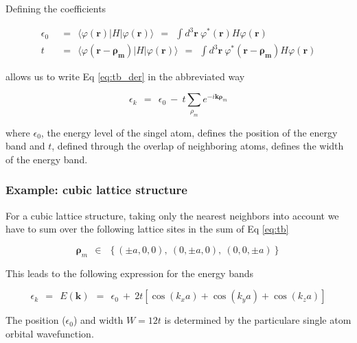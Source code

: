 \documentclass[10pt]{report}
\numberwithin{equation}{chapter}
\newcommand{\refEq}[1]{
  Eq  \ref{#1}
}
\begin{document}
Defining the coefficients 

\begin{align}
  \epsilon_0 ~~& =~~ \langle \varphi(\mathbf{r}) | H | \varphi(\mathbf{r}) \rangle  ~~=~~
  \int d^3\mathbf{r}\ \varphi^*(\mathbf{r}) H \varphi(\mathbf{r}) \\
  t ~~& =~~ \langle \varphi(\mathbf{r} - \mathbf{\rho_m}) |H| \varphi(\mathbf{r}) \rangle 
  ~~=~~ \int d^3\mathbf{r}\ \varphi^*(\mathbf{r} - \mathbf{\rho_m}) H \varphi(\mathbf{r})
\end{align}

allows us to write \refEq{eq:tb_der} in the abbreviated way

\begin{equation} \label{eq:tb}
  \epsilon_k ~~=~~ \epsilon_0 ~-~ t \sum_{\rho_m} e^{-i\mathbf{k} \mathbf{\rho}_m}
\end{equation}

where $\epsilon_0$, the energy level of the singel atom, defines the position of the energy band and $t$, defined through the overlap of neighboring atoms, defines the width of the energy band.


\subsubsection{Example: cubic lattice structure}

For a cubic lattice structure, taking only the nearest neighbors into account we have to sum over the following lattice sites in the sum of \refEq{eq:tb}

\begin{equation}
  \mathbf{\rho}_m ~~\in~~ \left\{ (\pm a,0 ,0),~ (0, \pm a, 0),~ (0, 0, \pm a) \right\}
\end{equation}

This leads to the following expression for the energy bands

\begin{equation}
  \epsilon_k ~~=~~ E(\mathbf{k}) ~~=~~ \epsilon_0 ~+~ 2t \left[ \cos(k_xa) + \cos(k_ya) + \cos(k_za) \right]
\end{equation}

The position ($\epsilon_0$) and width $W=12t$ is determined by the particulare single atom orbital wavefunction.


%
\end{document}
